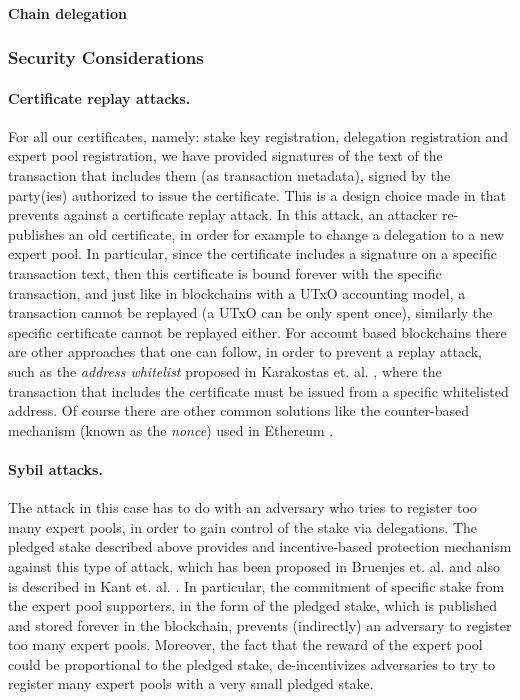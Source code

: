 \paragraph{Chain delegation}

\subsubsection*{Security Considerations} 

\paragraph{Certificate replay attacks.}
For all our certificates, namely: stake key registration, delegation registration and expert pool registration, we have provided signatures of the text of the transaction that includes them (as transaction metadata), signed by the party(ies) authorized to issue the certificate. This is a design choice made in \cite{deldesign} that prevents against a certificate replay attack. In this attack, an attacker re-publishes an old certificate, in order for example to change a delegation to a new expert pool. In particular, since the certificate includes a signature on a specific transaction text, then this certificate is bound forever with the specific transaction, and just like in blockchains with a UTxO accounting model, a transaction cannot be replayed (a UTxO can be only spent once), similarly the specific certificate cannot be replayed either. For account based blockchains there are other approaches that one can follow, in order to prevent a replay attack, such as the \emph{address whitelist} proposed in Karakostas et. al. \cite{stakepools}, where the transaction that includes the certificate must be issued from a specific whitelisted address. Of course there are other common solutions like the counter-based mechanism (known as the \emph{nonce}) used in Ethereum \cite{ethereum}.

\paragraph{Sybil attacks.}
The attack in this case has to do with an adversary who tries to register too many expert pools, in order to gain control of the stake via delegations. The pledged stake described above provides and incentive-based protection mechanism against this type of attack, which has been proposed in Bruenjes et. al. \cite{incentives} and also is described in Kant et. al. \citep{deldesign}. In particular, the commitment of specific stake from the expert pool supporters, in the form of the pledged stake, which is published and stored forever in the blockchain, prevents (indirectly) an adversary to register too many expert pools. Moreover, the fact that the reward of the expert pool could be proportional to the pledged stake, de-incentivizes adversaries to try to register many expert pools with a very small pledged stake. 

